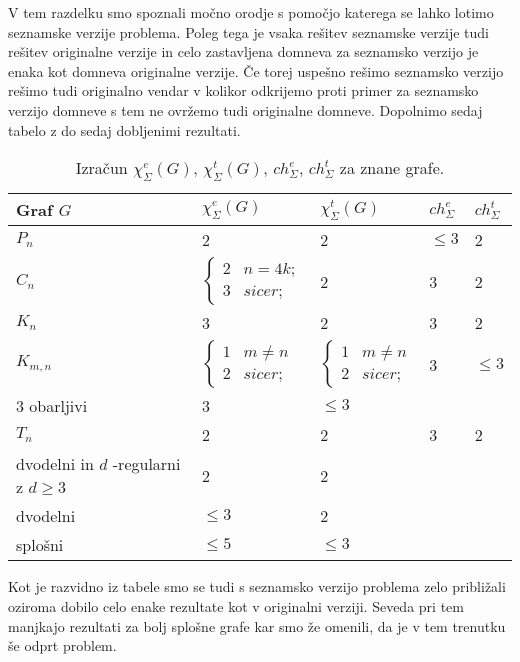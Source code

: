 \documentclass[12pt,a4paper,twoside]{article}
\theoremstyle{definition} %
\theoremstyle{plain} %
\newcommand{\ec}{\chi_{\Sigma}^e}
\newcommand{\ect}{\chi_{\Sigma}^t}
\numberwithin{equation}{section}  %
\begin{document}
V tem razdelku smo spoznali močno orodje s pomočjo katerega se lahko lotimo seznamske verzije problema. Poleg tega je vsaka rešitev seznamske verzije tudi rešitev originalne verzije in celo zastavljena domneva za seznamsko verzijo je enaka kot domneva originalne verzije. Če torej uspešno rešimo seznamsko verzijo rešimo tudi originalno vendar v kolikor odkrijemo proti primer za seznamsko verzijo domneve s tem ne ovržemo tudi originalne domneve. Dopolnimo sedaj tabelo z do sedaj dobljenimi rezultati.
\begin{table}[H]

\caption{\label{tab:tab3} Izračun $\ec(G)$,  $\ect(G)$, $ch_{\Sigma}^e$, $ch_{\Sigma}^t$ za znane grafe. }
\centering
\begin{tabular}{|l|l|l|l|l|}
\hline
 Graf $G$ & $\ec(G)$ & $\ect(G) $ & $ch_{\Sigma}^e$ & $ch_{\Sigma}^t$\\ \hline
 $P_n$ & 2 & 2 & $\le 3$ & 2\\ \hline
 $C_n$ & $\begin{cases}
	2 & n = 4k;\\ 
	3 & sicer;
	\end{cases}$ & 2 & 3 & 2\\ \hline
 $K_n$& 3 & 2 & 3 &2\\ \hline
 $K_{m,n}$& $\begin{cases}
	1 & m \neq n\\ 
	2 & sicer;
	\end{cases}$ &$\begin{cases}
	1 & m \neq n\\ 
	2 & sicer;
	\end{cases}$ &3 & $\le 3$\\ \hline
 3 obarljivi& 3 & $\le 3$& & \\ \hline
$T_n$ & 2 & 2& 3 & 2\\ \hline
dvodelni in $d$ -regularni z $d \ge 3 $ & 2  & 2& &\\ \hline
dvodelni   & $\le 3$  & 2 & &\\ \hline
splošni   & $\le 5$  &$ \le 3$ & &\\ \hline
\end{tabular}
\end{table}
Kot je razvidno iz tabele smo se tudi s seznamsko verzijo problema zelo približali oziroma dobilo celo enake rezultate kot v originalni verziji. Seveda pri tem manjkajo rezultati za bolj splošne grafe kar smo že omenili, da je v tem trenutku še odprt problem.
\end{document}
